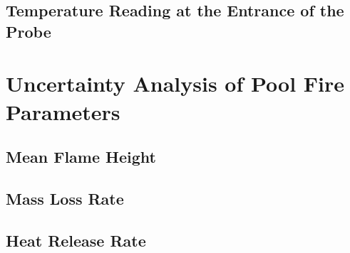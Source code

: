 \documentclass[12pt]{article}
\begin{document}
\subsection{Temperature Reading at the Entrance of the Probe}
\label{ssec:Probe_Temp}

\pagebreak

\section{Uncertainty Analysis of Pool Fire Parameters}\label{sec:Uncertainty_Pool_Fire_Parameters}

\subsection{Mean Flame Height}
\label{ssec:Mean_Flame_Height}

\subsection{Mass Loss Rate}
\label{ssec:Mass_Loss_Rate}

\subsection{Heat Release Rate}
\label{ssec:Heat_Release_Rate}

\pagebreak
\end{document}
